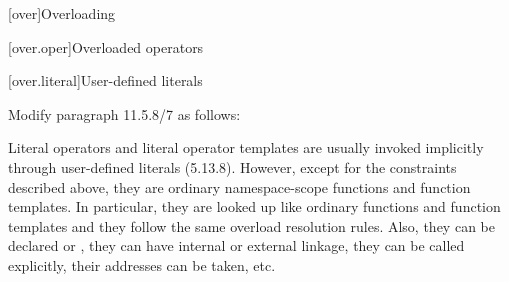 
\setcounter{chapter}{10}
[over]{Overloading}

\setcounter{section}{4}
[over.oper]{Overloaded operators}

\setcounter{subsection}{7}
[over.literal]{User-defined literals}

\noindent
Modify paragraph 11.5.8/7 as follows:
\begin{std.txt}
    \pnum[7]
    \enternote
    Literal operators and literal operator templates are usually invoked 
    implicitly through user-defined literals (5.13.8). However, except for 
    the constraints described above, they are ordinary namespace-scope 
    functions and function templates. In particular, they are looked up 
    like ordinary functions and function templates and they follow the same 
    overload resolution rules. Also, they can be declared 
     or , 
    they can have internal or external linkage, they can be called explicitly, 
    their addresses can be taken, etc.
    \exitnote
\end{std.txt}
